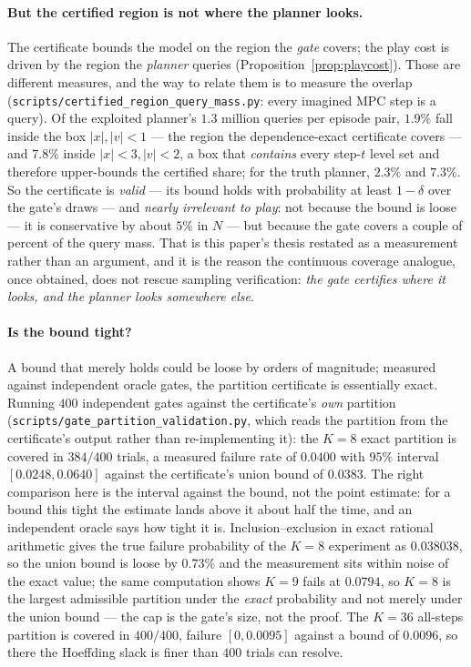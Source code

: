 \documentclass[11pt]{article}
\theoremstyle{definition}
\theoremstyle{remark}
\begin{document}
\paragraph{But the certified region is not where the planner looks.} The certificate bounds the model on the region the \emph{gate} covers; the play cost is driven by the region the \emph{planner} queries (Proposition~\ref{prop:playcost}). Those are different measures, and the way to relate them is to measure the overlap (\texttt{scripts/\allowbreak certified\_\allowbreak region\_\allowbreak query\_\allowbreak mass.py}: every imagined MPC step is a query). Of the exploited planner's $1.3$ million queries per episode pair, \textbf{$1.9\%$} fall inside the box $|x|,|v| < 1$ --- the region the dependence-exact certificate covers --- and $7.8\%$ inside $|x| < 3, |v| < 2$, a box that \emph{contains} every step-$t$ level set and therefore upper-bounds the certified share; for the truth planner, $2.3\%$ and $7.3\%$. So the certificate is \emph{valid} --- its bound holds with probability at least $1-\delta$ over the gate's draws --- and \emph{nearly irrelevant to play}: not because the bound is loose --- it is conservative by about $5\%$ in $N$ --- but because the gate covers a couple of percent of the query mass. That is this paper's thesis restated as a measurement rather than an argument, and it is the reason the continuous coverage analogue, once obtained, does not rescue sampling verification: \emph{the gate certifies where it looks, and the planner looks somewhere else}.

\paragraph{Is the bound tight?} A bound that merely holds could be loose by orders of magnitude; measured against independent oracle gates, the partition certificate is essentially exact. Running $400$ independent gates against the certificate's \emph{own} partition (\texttt{scripts/\allowbreak gate\_\allowbreak partition\_\allowbreak validation.py}, which reads the partition from the certificate's output rather than re-implementing it): the $K = 8$ exact partition is covered in $384/400$ trials, a measured failure rate of $0.0400$ with $95\%$ interval $[0.0248, 0.0640]$ against the certificate's union bound of $0.0383$. The right comparison here is the interval against the bound, not the point estimate: for a bound this tight the estimate lands above it about half the time, and an independent oracle says how tight it is. Inclusion--exclusion in exact rational arithmetic gives the true failure probability of the $K = 8$ experiment as $0.038038$, so the union bound is loose by $0.73\%$ and the measurement sits within noise of the exact value; the same computation shows $K = 9$ fails at $0.0794$, so $K = 8$ is the largest admissible partition under the \emph{exact} probability and not merely under the union bound --- the cap is the gate's size, not the proof. The $K = 36$ all-steps partition is covered in $400/400$, failure $[0, 0.0095]$ against a bound of $0.0096$, so there the Hoeffding slack is finer than $400$ trials can resolve.
\end{document}
